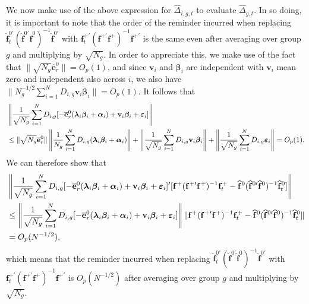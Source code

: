 \documentclass[12pt,fleqn]{article}
\def\*#1{\mathbf{#1}}
\def\+#1{\boldsymbol{#1}}
\begin{document}
We now make use of the above expression for $\widehat \Delta_{i,g,t}$ to evaluate $\widehat \Delta_{g,t}$. In so doing, it is important to note that the order of the reminder incurred when replacing $\widehat{\*f}_t^{0\prime}(\widehat{\*f}^{0\prime}\widehat{\*f}^0)^{-1}\widehat{\*f}^{0\prime}$ with $\*f_t^{+\prime}(\*f^{+\prime}\*f^+)^{-1}\*f^{+\prime}$ is the same even after averaging over group $g$ and multiplying by $\sqrt{N_g}$. In order to appreciate this, we make use of the fact that $\|\sqrt{N_g}\overline{\*e}_{r}^0\| = O_p(1)$, and since $\*v_{i}$ and $\+\beta_i$ are independent with $\*v_i$ mean zero and independent also across $i$, we also have $\|N_g^{-1/2}\sum_{i= 1}^{N} D_{i,g} \*v_{i}\+\beta_i\| = O_p(1)$. It follows that
\begin{align}
& \left\|\frac{1}{\sqrt{N_g}}\sum_{i= 1}^{N} D_{i,g}[ - \overline{\*e}_{r}^0(\+\lambda_i\+\beta_i +\+\alpha_i) + \*v_i\+\beta_i+  \+\varepsilon_{i} ] \right\|\notag\\
& \leq \|\sqrt{N_g}\overline{\*e}_{r}^0\|\left\|\frac{1}{N_g} \sum_{i= 1}^{N} D_{i,g} (\+\lambda_i\+\beta_i +\+\alpha_i)\right\| + \left\| \frac{1}{\sqrt{N_g}} \sum_{i= 1}^{N} D_{i,g} \*v_{i}\+\beta_i \right\| +  \left\|\frac{1}{\sqrt{N_g}} \sum_{i= 1}^{N} D_{i,g} \+\varepsilon_{i}\right\| =O_p(1).
\end{align}
We can therefore show that
\begin{align}
& \left\|\frac{1}{\sqrt{N_g}}\sum_{i= 1}^{N} D_{i,g}[ - \overline{\*e}_{r}^0(\+\lambda_i\+\beta_i +\+\alpha_i) + \*v_i\+\beta_i+  \+\varepsilon_{i} ]'[\*f^{+} (\*f^{+\prime}\*f^+)^{-1}\*f_t^+ - \widehat{\*f}^{0} (\widehat{\*f}^{0\prime}\widehat{\*f}^0)^{-1}\widehat{\*f}_t^0] \right\| \notag\\
& \leq
\left\| \frac{1}{\sqrt{N_g}}\sum_{i= 1}^{N} D_{i,g}[ - \overline{\*e}_{r}^0(\+\lambda_i\+\beta_i +\+\alpha_i) + \*v_i\+\beta_i+  \+\varepsilon_{i} ]\right\| \|\*f^{+} (\*f^{+\prime}\*f^+)^{-1}\*f_t^+ - \widehat{\*f}^{0} (\widehat{\*f}^{0\prime}\widehat{\*f}^0)^{-1}\widehat{\*f}_t^0\|\notag\\
& = O_p(N^{-1/2}),
\end{align}
which means that the reminder incurred when replacing $\widehat{\*f}_t^{0\prime}(\widehat{\*f}^{0\prime}\widehat{\*f}^0)^{-1}\widehat{\*f}^{0\prime}$ with $\*f_t^{+\prime}(\*f^{+\prime}\*f^+)^{-1}\*f^{+\prime}$ is $O_p(N^{-1/2})$ after averaging over group $g$ and multiplying by $\sqrt{N_g}$. 
\end{document}

